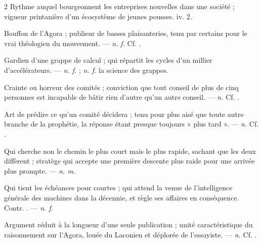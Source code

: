 \begin{multicols}{2}
 Rythme auquel bourgeonnent les entreprises nouvelles dans une société ; vigueur printanière d'un écosystème de jeunes pousses.   iv. 2.

 Bouffon de l'Agora ; publieur de basses plaisanteries, tenu par certains pour le vrai théologien du mouvement.  —  \textit{n. f.} Cf. .

 Gardien d'une grappe de calcul ; qui répartit les cycles d'un millier d'accélérateurs.   —  \textit{n. f.} ;  \textit{n. f.} la science des grappes.

 Crainte ou horreur des comités ; conviction que tout conseil de plus de cinq personnes est incapable de bâtir rien d'autre qu'un autre conseil. —  \textit{n.} Cf. .

 Art de prédire ce qu'un comité décidera ; tenu pour plus aisé que toute autre branche de la prophétie, la réponse étant presque toujours « plus tard ». —  \textit{n.} Cf. .

 Qui cherche non le chemin le plus court mais le plus rapide, sachant que les deux diffèrent ; stratège qui accepte une première descente plus raide pour une arrivée plus prompte. —  \textit{n. m.}

 Qui tient les échéances pour courtes ; qui attend la venue de l'intelligence générale des machines dans la décennie, et règle ses affaires en conséquence. Contr. . —  \textit{n. f.}

 Argument réduit à la longueur d'une seule publication ; unité caractéristique du raisonnement sur l'Agora, louée du Laconien et déplorée de l'essayiste. —  \textit{n.} Cf. .


\end{multicols}
